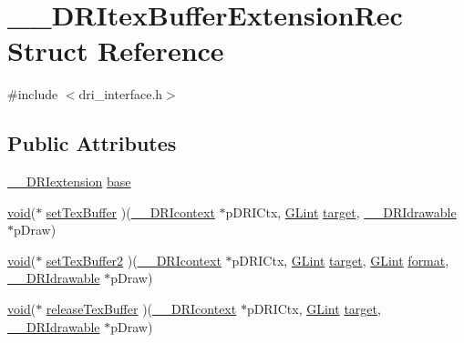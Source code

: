 \hypertarget{struct_____d_r_itex_buffer_extension_rec}{}\section{\+\_\+\+\_\+\+D\+R\+Itex\+Buffer\+Extension\+Rec Struct Reference}
\label{struct_____d_r_itex_buffer_extension_rec}


{\ttfamily \#include $<$dri\+\_\+interface.\+h$>$}

\subsection*{Public Attributes}
\begin{DoxyCompactItemize}
\item 
\hyperlink{dri__interface_8h_a4e0a61c8ece00d2b2c6792a9a1b55385}{\+\_\+\+\_\+\+D\+R\+Iextension} \hyperlink{struct_____d_r_itex_buffer_extension_rec_a979ee2a12e9e249c0fb492f7308d19a4}{base}
\item 
\hyperlink{_s_d_l__opengles2__gl2ext_8h_ae5d8fa23ad07c48bb609509eae494c95}{void}($\ast$ \hyperlink{struct_____d_r_itex_buffer_extension_rec_ad30aace2350457abe54c792327be1d3c}{set\+Tex\+Buffer} )(\hyperlink{dri__interface_8h_a3fd295cba82b5a3d79f1ee7e12bfb908}{\+\_\+\+\_\+\+D\+R\+Icontext} $\ast$p\+D\+R\+I\+Ctx, \hyperlink{gl_8h_acebcc1c5663f14ebde1d16831e5fed94}{G\+Lint} \hyperlink{glcorearb_8h_af9d0cbbbeb7414e786c41899e5a856d7}{target}, \hyperlink{dri__interface_8h_a5bfb832a0a08208d95b3bbef439d2262}{\+\_\+\+\_\+\+D\+R\+Idrawable} $\ast$p\+Draw)
\item 
\hyperlink{_s_d_l__opengles2__gl2ext_8h_ae5d8fa23ad07c48bb609509eae494c95}{void}($\ast$ \hyperlink{struct_____d_r_itex_buffer_extension_rec_ab30d162fbd2ae10cc2597d393028cc18}{set\+Tex\+Buffer2} )(\hyperlink{dri__interface_8h_a3fd295cba82b5a3d79f1ee7e12bfb908}{\+\_\+\+\_\+\+D\+R\+Icontext} $\ast$p\+D\+R\+I\+Ctx, \hyperlink{gl_8h_acebcc1c5663f14ebde1d16831e5fed94}{G\+Lint} \hyperlink{glcorearb_8h_af9d0cbbbeb7414e786c41899e5a856d7}{target}, \hyperlink{gl_8h_acebcc1c5663f14ebde1d16831e5fed94}{G\+Lint} \hyperlink{gl_8h_a71a65ffd977afe9c3fef116a5bc9ee27}{format}, \hyperlink{dri__interface_8h_a5bfb832a0a08208d95b3bbef439d2262}{\+\_\+\+\_\+\+D\+R\+Idrawable} $\ast$p\+Draw)
\item 
\hyperlink{_s_d_l__opengles2__gl2ext_8h_ae5d8fa23ad07c48bb609509eae494c95}{void}($\ast$ \hyperlink{struct_____d_r_itex_buffer_extension_rec_a523c3e47c75adf34910a04abf006cc79}{release\+Tex\+Buffer} )(\hyperlink{dri__interface_8h_a3fd295cba82b5a3d79f1ee7e12bfb908}{\+\_\+\+\_\+\+D\+R\+Icontext} $\ast$p\+D\+R\+I\+Ctx, \hyperlink{gl_8h_acebcc1c5663f14ebde1d16831e5fed94}{G\+Lint} \hyperlink{glcorearb_8h_af9d0cbbbeb7414e786c41899e5a856d7}{target}, \hyperlink{dri__interface_8h_a5bfb832a0a08208d95b3bbef439d2262}{\+\_\+\+\_\+\+D\+R\+Idrawable} $\ast$p\+Draw)
\end{DoxyCompactItemize}


